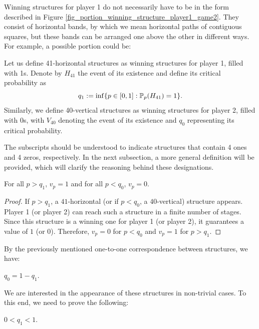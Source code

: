         \begin{remark}\label{remark_structures_restricted_game2}
            Winning structures for player 1 do not necessarily have to be in the form described in Figure \ref{fig_portion_winning_structure_player1_game2}. They consist of horizontal bands, by which we mean horizontal paths of contiguous squares, but these bands can be arranged one above the other in different ways. For example, a possible portion could be:
           
        \end{remark}

        Let us define 41-horizontal structures as winning structures for player 1, filled with 1s. Denote by $H_{41}$ the event of its existence and define its critical probability as
        \[
            q_1 := \inf \{p \in [0, 1] : \mathbb{P}_p(H_{41}) = 1\}.
        \]
        Similarly, we define 40-vertical structures as winning structures for player 2, filled with 0s, with $V_{40}$ denoting the event of its existence and $q_0$ representing its critical probability.

       The subscripts should be understood to indicate structures that contain 4 ones and 4 zeros, respectively. In the next subsection, a more general definition will be provided, which will clarify the reasoning behind these designations.
       
        \begin{theorem}\label{theorem-v0-q0-v1-q1}
            For all $p > q_1$, $v_p = 1$ and for all $p < q_0$, $v_p = 0$.
        \end{theorem}
        \begin{proof}
            If $p > q_1$, a $41$-horizontal (or if $p < q_0$, a $40$-vertical) structure appears. Player 1 (or player 2) can reach such a structure in a finite number of stages. Since this structure is a winning one for player 1 (or player 2), it guarantees a value of $1$ (or 0). Therefore, $v_p =  0$ for $p < q_0$ and $v_p =  1$ for $p > q_1$. 

        \end{proof}

       By the previously mentioned one-to-one correspondence between structures, we have:
       \begin{proposition}\label{proposition-relation-q0-q1}
            $q_0 = 1 - q_1$.
       \end{proposition}

       We are interested in the appearance of these structures in non-trivial cases. To this end, we need to prove the following:
       \begin{theorem}\label{theorem-q0}
            $0 < q_1 < 1$.
       \end{theorem}

